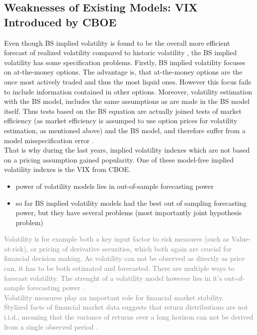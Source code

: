 \subsection{Weaknesses of Existing Models: VIX Introduced by CBOE}
Even though BS implied volatility is found to be the overall more efficient forecast of realized volatility compared to historic volatility \parencite{jiang2003}, the \gls{BS} implied volatility has some specification problems. Firstly, \gls{BS} implied volatility focuses on at-the-money options. The advantage is, that at-the-money options are the once most actively traded and thus the most liquid ones. However this focus fails to include information contained in other options. Moreover, volatility estimation with the \gls{BS} model, includes the same assumptions as are made in the \gls{BS} model itself. Thus tests based on the \gls{BS} equation are actually joined tests of market efficiency (as market efficiency is assumped to use option prices for volatility estimation, as mentioned above) and the \gls{BS} model, and therefore suffer from a model misspecification error \parencite{jiang2003}. \\
That is why during the last years, implied volatility indexes which are not based on a pricing assumption gained popularity. One of these model-free implied volatility indexes is the VIX from CBOE.

\begin{itemize}\itemsep0pt
\item power of volatility models lies in out-of-sample forecasting power
\item so far \gls{BS} implied volatility models had the best out of sampling forecasting power, but they have several problems (most importantly joint hypothesis problem) 
\end{itemize}

\textcolor{gray}{
Volatility is for example both a key input factor to risk measures (such as Value-at-risk), or pricing of derivative securities, which both again are crucial for financial decision making. As volatility can not be observed as directly as price can, it has to be both estimated and forecasted. There are multiple ways to forecast volatility. The strenght of a volatility model however lies in it's out-of-sample forecasting power \parencite{poon2003}. \\
Volatility measures play an important role for financial market stability.\\
Stylized facts of financial market data suggests that return distributions are not i.i.d., meaning that the variance of returns over a long horizon can not be derived from a single observed period \parencite{poon2003}. }


